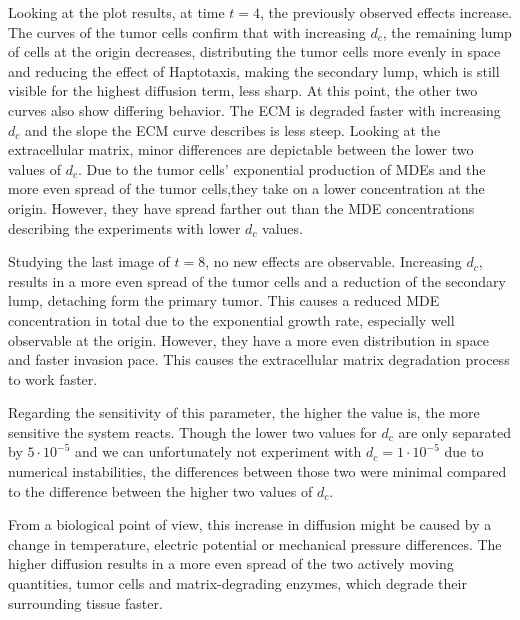 Looking at the plot results, at time $t=4$, the previously observed effects increase. The curves of the tumor cells confirm that with increasing $d_c$, the remaining lump of cells at the origin decreases, distributing the tumor cells more evenly in space and reducing the effect of Haptotaxis, making the secondary lump, which is still visible for the highest diffusion term, less sharp. At this point, the other two curves also show differing behavior. The ECM is degraded faster with increasing $d_c$ and the slope the ECM curve describes is less steep. Looking at the extracellular matrix, minor differences are depictable between the lower two values of $d_c$. Due to the tumor cells' exponential production of MDEs and the more even spread of the tumor cells,they take on a lower concentration at the origin. However, they have spread farther out than the MDE concentrations describing the experiments with lower $d_c$ values.

Studying the last image of $t=8$, no new effects are observable. Increasing $d_c$, results in a more even spread of the tumor cells and a reduction of the secondary lump, detaching form the primary tumor. This causes a reduced MDE concentration in total due to the exponential growth rate, especially well observable at the origin. However, they have a more even distribution in space and faster invasion pace. This causes the extracellular matrix degradation process to work faster.

Regarding the sensitivity of this parameter, the higher the value is, the more sensitive the system reacts. Though the lower two values for $d_c$ are only separated by $5\cdot 10^{-5}$ and we can unfortunately not experiment with $d_c=1 \cdot 10^{-5}$ due to numerical instabilities, the differences between those two were minimal compared to the difference between the higher two values of $d_c$.

From a biological point of view, this increase in diffusion might be caused by a change in temperature, electric potential or mechanical pressure differences. The higher diffusion results in a more even spread of the two actively moving quantities, tumor cells and matrix-degrading enzymes, which degrade their surrounding tissue faster.


